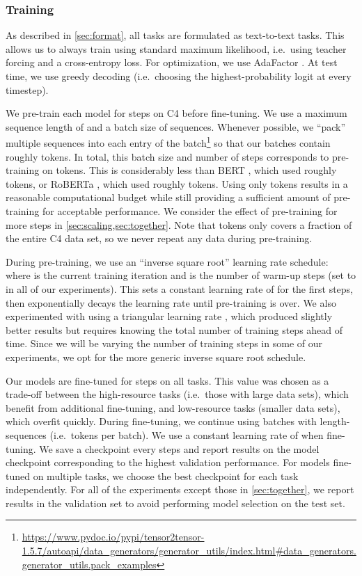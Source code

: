 \documentclass[twoside,11pt]{article}
\begin{document}
\subsubsection{Training}
\label{sec:training}

As described in \cref{sec:format}, all tasks are formulated as text-to-text tasks.
This allows us to always train using standard maximum likelihood, i.e.\ using teacher forcing \citep{williams1989learning} and a cross-entropy loss.
For optimization, we use AdaFactor \citep{shazeer2018adafactor}.
At test time, we use greedy decoding (i.e.\ choosing the highest-probability logit at every timestep).

We pre-train each model for  steps on C4 before fine-tuning.
We use a maximum sequence length of  and a batch size of  sequences.
Whenever possible, we ``pack'' multiple sequences into each entry of the batch\footnote{\url{https://www.pydoc.io/pypi/tensor2tensor-1.5.7/autoapi/data_generators/generator_utils/index.html\#data_generators.generator_utils.pack_examples}} so that our batches contain roughly  tokens.
In total, this batch size and number of steps corresponds to pre-training on  tokens.
This is considerably less than BERT \citep{devlin2018bert}, which used roughly  tokens, or RoBERTa \citep{liu2019roberta}, which used roughly  tokens.
Using only  tokens results in a reasonable computational budget while still providing a sufficient amount of pre-training for acceptable performance.
We consider the effect of pre-training for more steps in \cref{sec:scaling,sec:together}.
Note that  tokens only covers a fraction of the entire C4 data set, so we never repeat any data during pre-training.

During pre-training, we use an ``inverse square root'' learning rate schedule:  where  is the current training iteration and  is the number of warm-up steps (set to  in all of our experiments).
This sets a constant learning rate of  for the first  steps, then exponentially decays the learning rate until pre-training is over.
We also experimented with using a triangular learning rate \citep{howard2018universal}, which produced slightly better results but requires knowing the total number of training steps ahead of time.
Since we will be varying the number of training steps in some of our experiments, we opt for the more generic inverse square root schedule.

Our models are fine-tuned for  steps on all tasks.
This value was chosen as a trade-off between the high-resource tasks (i.e.\ those with large data sets), which benefit from additional fine-tuning, and low-resource tasks (smaller data sets), which overfit quickly.
During fine-tuning, we continue using batches with  length- sequences (i.e.\  tokens per batch).
We use a constant learning rate of  when fine-tuning.
We save a checkpoint every  steps and report results on the model checkpoint corresponding to the highest validation performance.
For models fine-tuned on multiple tasks, we choose the best checkpoint for each task independently.
For all of the experiments except those in \cref{sec:together}, we report results in the validation set to avoid performing model selection on the test set.
\end{document}
